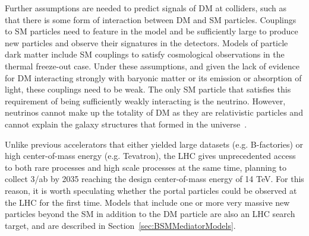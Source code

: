 

Further assumptions are needed to predict signals of DM at colliders, such
as that there is some form of interaction between DM and SM particles. 
Couplings to SM particles need to feature in the model and be sufficiently large
to produce new particles and observe their signatures in the detectors. 
Models of particle dark matter include SM couplings to satisfy
cosmological observations in the thermal freeze-out case. 
Under these assumptions, and given the lack of evidence for 
DM interacting strongly with baryonic matter or its emission or absorption of light,
these couplings need to be weak. 
The only SM particle that satisfies this requirement of being
sufficiently weakly interacting is the neutrino.
However, neutrinos cannot make up the totality of DM as they 
are relativistic particles and cannot explain the galaxy structures that formed in the universe~\cite{PlehnLecturesDM}. 

Unlike previous accelerators that either yielded large datasets (e.g. B-factories) or high center-of-mass energy (e.g. Tevatron), the LHC gives unprecedented access to both rare processes and high scale processes at the same time, planning to collect 3/ab by 2035 reaching the design center-of-mass energy of 14 TeV. For this reason, it is worth speculating whether the portal particles could be observed at the LHC for the first time. Models that include one or more very massive new particles beyond the SM in addition to the DM particle are also an LHC search target, and are described in Section~\ref{sec:BSMMediatorModels}. 

